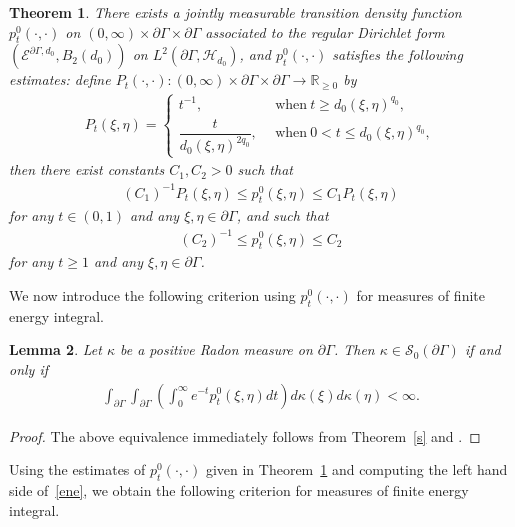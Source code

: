\documentclass[10pt]{amsart}
\newtheorem{theo}{Theorem}[section]
\newtheorem{lemm}[theo]{Lemma}\newtheorem{prop}[theo]{Proposition}\newtheorem{coro}[theo]{Corollary}\newtheorem{conj}[theo]{Conjecture}
\theoremstyle{definition}\newtheorem{defi}[theo]{Definition}\newtheorem{rema}[theo]{Remark}\newtheorem{exam}[theo]{Example}\newtheorem{exem}[theo]{Example}\newtheorem{nota}[theo]{Notation}
\newcommand{\ce}{\mathcal{E}}
\newcommand{\cs}{\mathcal{S}}
\newcommand{\ch}{\mathcal{H}}
\newcommand{\br}{\mathbb{R}}
\begin{document}
\begin{theo}\label{ck}
There exists a jointly measurable transition density function $p_t^0(\cdot,\cdot)$ on $(0,\infty)\times\partial\Gamma\times\partial\Gamma$ associated to the regular Dirichlet form $(\ce^{\partial\Gamma,d_0},B_2(d_0))$ on $L^2(\partial\Gamma,\ch_{d_0})$, and $p_t^0(\cdot,\cdot)$ satisfies the following estimates: define $P_t(\cdot,\cdot):(0,\infty)\times\partial\Gamma\times\partial\Gamma\to\br_{\geq0}$ by
\begin{align*}
P_t(\xi,\eta)=
\begin{cases}
t^{-1},\ \ &\text{when}\ t\geq d_0(\xi,\eta)^{q_0},\\
\dfrac{t}{d_0(\xi,\eta)^{2q_0}},\ \ &\text{when}\ 0<t\leq d_0(\xi,\eta)^{q_0},
\end{cases}
\end{align*}
then there exist constants $C_1,C_2>0$ such that
\begin{align*}
(C_1)^{-1}P_t(\xi,\eta)\leq p_t^0(\xi,\eta)\leq C_1P_t(\xi,\eta)
\end{align*}
for any $t\in(0,1)$ and any $\xi,\eta\in\partial\Gamma$, and such that
\begin{align*}
(C_2)^{-1}\leq p_t^0(\xi,\eta)\leq C_2
\end{align*}
for any $t\geq1$ and any $\xi,\eta\in\partial\Gamma$.
\end{theo}

We now introduce the following criterion using $p_t^0(\cdot,\cdot)$ for measures of finite energy integral.

\begin{lemm}\label{rho2}
Let $\kappa$ be a positive Radon measure on $\partial\Gamma$. Then $\kappa\in\cs_0(\partial\Gamma)$ if and only if
\begin{align}\label{ene}
\int_{\partial\Gamma}\int_{\partial\Gamma}\left(\int_0^{\infty}e^{-t}p_t^0(\xi,\eta)dt\right)d\kappa(\xi) d\kappa(\eta)<\infty.
\end{align}
\end{lemm}

\begin{proof}
The above equivalence immediately follows from Theorem~\ref{s} and \cite[Problem~4.2.1]{FOT}.
\end{proof}


Using the estimates of $p_t^0(\cdot,\cdot)$ given in Theorem~\ref{ck} and computing the left hand side of~\eqref{ene}, we obtain the following criterion for measures of finite energy integral.
\end{document}
